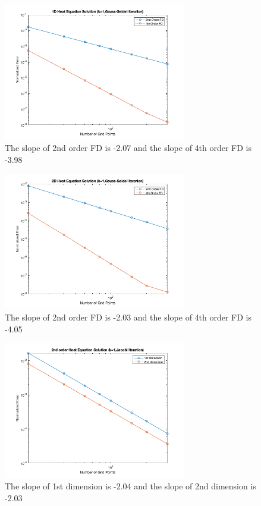 \documentclass{article}
\begin{document}
\begin{figure}[h!]
  \includegraphics[width=8cm]{figure_7}
  \caption{The slope of 2nd order FD is -2.07 and the slope of 4th order FD is -3.98}
\end{figure}

\begin{figure}[h!]
  \includegraphics[width=8cm]{figure_8}
  \caption{The slope of 2nd order FD is -2.03 and the slope of 4th order FD is -4.05}
\end{figure}

\begin{figure}[h!]
  \includegraphics[width=8cm]{figure_9}
  \caption{The slope of 1st dimension is -2.04 and the slope of 2nd dimension is -2.03}
\end{figure}
\end{document}
